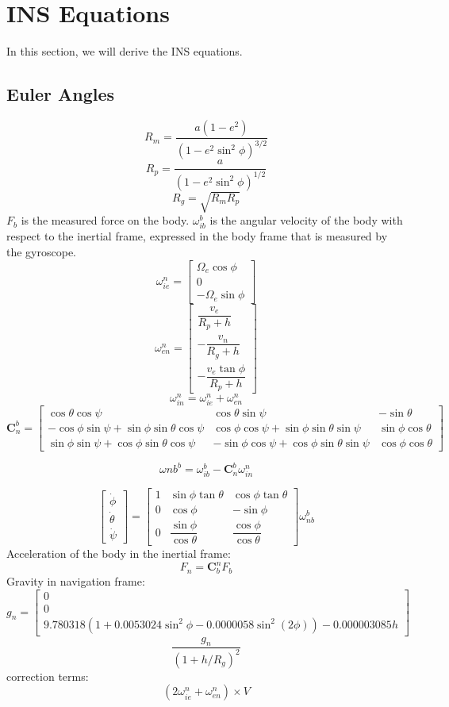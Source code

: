 \section{INS Equations}
In this section, we will derive the INS equations.
\subsection{Euler Angles}
\[
R_m = \dfrac{a(1-e^2)}{(1-e^2\sin^2\phi)^{3/2}}
\]
\[
    R_p = \dfrac{a}{(1-e^2\sin^2\phi)^{1/2}}
\]
\[
    R_g = \sqrt{R_m R_p}
\]
$F_b$ is the measured force on the body.
$\omega_{ib}^b$ is the angular velocity of the body with respect to the inertial frame, expressed in the body frame that is measured by the gyroscope.
\[
    \omega_{ie}^n = \begin{bmatrix}
        \Omega_e \cos\phi \\
        0 \\
        -\Omega_e \sin\phi
    \end{bmatrix}
\]
\[
    \omega_{en}^n = \begin{bmatrix}
        \dfrac{v_e}{R_p+h} \\[1em]
        -\dfrac{v_n}{R_g+h} \\[1em]
        -\dfrac{v_e\tan\phi}{R_p+h}
    \end{bmatrix}
\]
\[
    \omega_{in}^n = \omega_{ie}^n + \omega_{en}^n
\]
\[
    \bm{C}_n^b = \begin{bmatrix}
        \cos\theta\cos\psi & \cos\theta\sin\psi & -\sin\theta \\
        -\cos\phi\sin\psi+\sin\phi\sin\theta\cos\psi & \cos\phi\cos\psi+\sin\phi\sin\theta\sin\psi & \sin\phi\cos\theta \\
        \sin\phi\sin\psi+\cos\phi\sin\theta\cos\psi & -\sin\phi\cos\psi+\cos\phi\sin\theta\sin\psi & \cos\phi\cos\theta
    \end{bmatrix}
\]

\[
    \omega{nb}^b = \omega_{ib}^b - \bm{C}_n^b \omega_{in}^n
\]

\[
    \begin{bmatrix}
        \dot{\phi} \\
        \dot{\theta} \\
        \dot{\psi}
    \end{bmatrix} = \begin{bmatrix}
        1 & \sin\phi\tan\theta & \cos\phi\tan\theta \\
        0 & \cos\phi & -\sin\phi \\
        0 & \dfrac{\sin\phi}{\cos\theta} & \dfrac{\cos\phi}{\cos\theta}
    \end{bmatrix} \omega_{nb}^b
\]
Acceleration of the body in the inertial frame:
\[
    F_n = \bm{C}_b^n F_b
\]
Gravity in navigation frame:
\[
    g_n = \begin{bmatrix}
        0 \\
        0 \\
        9.780318(1+0.0053024\sin^2\phi-0.0000058\sin^2(2\phi)) - 0.000003085h
    \end{bmatrix}
\]
\[
    \dfrac{g_n}{(1 + h/R_g)^2} 
\]
correction terms:
\[
    (2\omega_{ie}^n + \omega_{en}^n) \times V
\]

